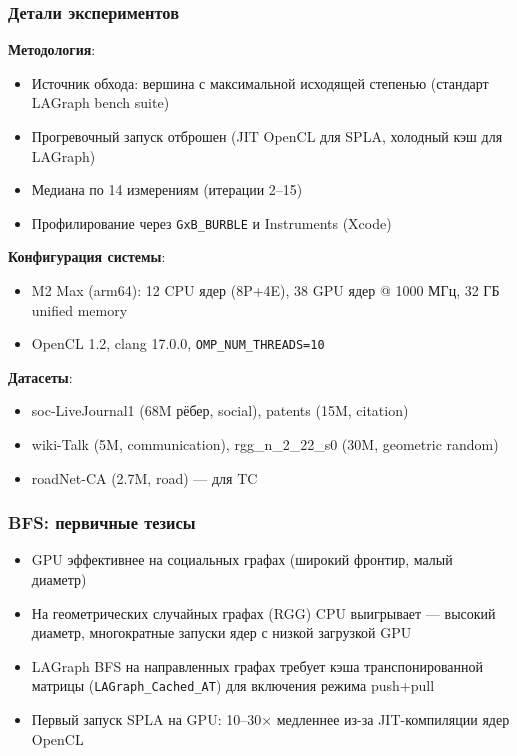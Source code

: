 \documentclass{beamer}
\begin{document}
\begin{frame}
  \frametitle{Детали экспериментов}
  \textbf{Методология}:
  \begin{itemize}
    \item Источник обхода: вершина с максимальной исходящей степенью (стандарт LAGraph bench suite)
    \item Прогревочный запуск отброшен (JIT OpenCL для SPLA, холодный кэш для LAGraph)
    \item Медиана по 14 измерениям (итерации 2--15)
    \item Профилирование через \texttt{GxB\_BURBLE} и Instruments (Xcode)
  \end{itemize}
  \textbf{Конфигурация системы}:
  \begin{itemize}
    \item M2 Max (arm64): 12 CPU ядер (8P+4E), 38 GPU ядер @ 1000 МГц, 32 ГБ unified memory
    \item OpenCL 1.2, clang 17.0.0, \texttt{OMP\_NUM\_THREADS=10}
  \end{itemize}
  \textbf{Датасеты}:
  \begin{itemize}
    \item soc-LiveJournal1 (68M рёбер, social), patents (15M, citation)
    \item wiki-Talk (5M, communication), rgg\_n\_2\_22\_s0 (30M, geometric random)
    \item roadNet-CA (2.7M, road) --- для TC
  \end{itemize}
\end{frame}

\begin{frame}
  \frametitle{BFS: первичные тезисы}
  \begin{itemize}
    \item GPU эффективнее на социальных графах (широкий фронтир, малый диаметр)
    \item На геометрических случайных графах (RGG) CPU выигрывает --- высокий диаметр,
          многократные запуски ядер с низкой загрузкой GPU
    \item LAGraph BFS на направленных графах требует кэша транспонированной матрицы
          (\texttt{LAGraph\_Cached\_AT}) для включения режима push+pull
    \item Первый запуск SPLA на GPU: 10--30× медленнее из-за JIT-компиляции ядер OpenCL
  \end{itemize}
\end{frame}
\end{document}
